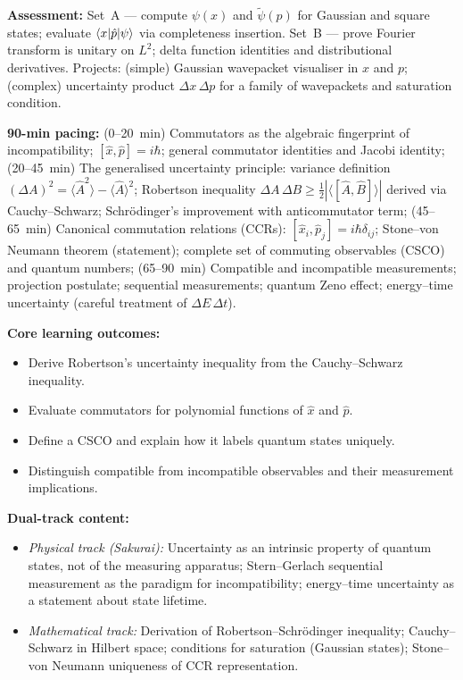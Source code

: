 \documentclass[11pt,a4paper]{article}
\begin{document}
\begin{tcolorbox}[modulebox, title={Module~I.3 --- Lecture L02: Bases: Discrete and Continuous}]
\medskip\textbf{Assessment:}
Set~A --- compute $\psi(x)$ and $\tilde{\psi}(p)$ for Gaussian and square states;
evaluate $\braket{x|\hat{p}|\psi}$ via completeness insertion.
Set~B --- prove Fourier transform is unitary on $L^2$; delta function identities and
distributional derivatives.
Projects: (simple) Gaussian wavepacket visualiser in $x$ and $p$; (complex) uncertainty
product $\Delta x\,\Delta p$ for a family of wavepackets and saturation condition.
\end{tcolorbox}

\begin{tcolorbox}[modulebox, title={Module~I.3 --- Lecture L03: Uncertainty and Commutation Relations}]
\textbf{90-min pacing:} (0--20~min) Commutators as the algebraic fingerprint of incompatibility;
$[\hat{x},\hat{p}]=i\hbar$; general commutator identities and Jacobi identity;
(20--45~min) The generalised uncertainty principle: variance definition
$(\Delta A)^2=\langle\hat{A}^2\rangle-\langle\hat{A}\rangle^2$;
Robertson inequality $\Delta A\,\Delta B\geq\tfrac{1}{2}|\langle[\hat{A},\hat{B}]\rangle|$
derived via Cauchy--Schwarz; Schr\"odinger's improvement with anticommutator term;
(45--65~min) Canonical commutation relations (CCRs):
$[\hat{x}_i,\hat{p}_j]=i\hbar\delta_{ij}$; Stone--von Neumann theorem (statement);
complete set of commuting observables (CSCO) and quantum numbers;
(65--90~min) Compatible and incompatible measurements; projection postulate;
sequential measurements; quantum Zeno effect; energy--time uncertainty
(careful treatment of $\Delta E\,\Delta t$).

\medskip\textbf{Core learning outcomes:}
\begin{itemize}[leftmargin=1.4em,topsep=2pt,itemsep=1pt]
  \item Derive Robertson's uncertainty inequality from the Cauchy--Schwarz inequality.
  \item Evaluate commutators for polynomial functions of $\hat{x}$ and $\hat{p}$.
  \item Define a CSCO and explain how it labels quantum states uniquely.
  \item Distinguish compatible from incompatible observables and their measurement implications.
\end{itemize}

\medskip\textbf{Dual-track content:}
\begin{itemize}[leftmargin=1.4em,topsep=2pt,itemsep=1pt]
  \item \textit{Physical track (Sakurai):} Uncertainty as an intrinsic property of
    quantum states, not of the measuring apparatus; Stern--Gerlach sequential
    measurement as the paradigm for incompatibility; energy--time uncertainty as
    a statement about state lifetime.
  \item \textit{Mathematical track:} Derivation of Robertson--Schr\"odinger inequality;
    Cauchy--Schwarz in Hilbert space; conditions for saturation (Gaussian states);
    Stone--von Neumann uniqueness of CCR representation.
\end{itemize}


\end{tcolorbox}
\end{document}
